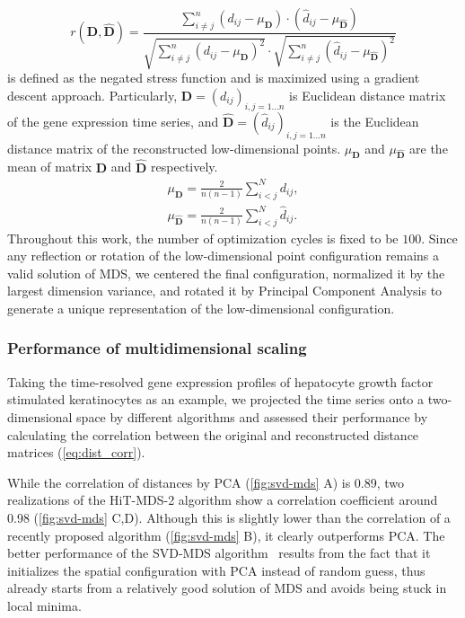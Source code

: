 \begin{equation}
  r(\boldsymbol{D}, \hat{\boldsymbol{D}}) = \frac{\sum_{i \neq j}^n (d_{ij} - \mu_{\boldsymbol{D}}
    ) \cdot (\hat{d}_{ij} - 
    \mu_{\hat{\boldsymbol{D}}})}{\sqrt{\sum_{i \neq j}^n (d_{ij} - \mu_{\boldsymbol{D}})^2} 
    \cdot \sqrt{
    \sum_{i \neq j}^n (\hat{d}_{ij} - \mu_{\hat{\boldsymbol{D}}})^2}}
  \label{eq:dist_corr}
\end{equation}
is defined as the negated stress function and is maximized using a gradient descent approach.
Particularly, $\boldsymbol{D} = (d_{ij})_{i,j=1...n}$ is Euclidean distance matrix of the
gene expression time series, and $\hat{\boldsymbol{D}} = (\hat{d}_{ij})_{i,j=1...n}$ 
is the 
Euclidean distance matrix of the reconstructed low-dimensional points. 
$\mu_{\boldsymbol{D}}$ and $\mu_{\hat{\boldsymbol{D}}}$ are the mean of matrix $\boldsymbol{D}$
and $\hat{\boldsymbol{D}}$ respectively.
\begin{eqnarray}
  \mu_{\boldsymbol{D}} = \frac{2}{n (n-1)} \sum_{i<j}^N d_{ij},\\
  \mu_{\hat{\boldsymbol{D}}} = \frac{2}{n (n-1)} \sum_{i<j}^N \hat{d}_{ij}.
\end{eqnarray}
Throughout this work, the number of optimization cycles is fixed to be $100$.
Since any reflection or rotation of the low-dimensional point configuration
remains a valid solution of MDS,
we centered the final configuration, normalized it by the largest dimension variance,
and rotated it by Principal Component Analysis to generate a unique 
representation of the low-dimensional configuration.

\subsubsection{Performance of multidimensional scaling}
Taking the time-resolved gene expression profiles of hepatocyte growth factor
stimulated keratinocytes as an example, we projected the time series onto a 
two-dimensional space by different algorithms and assessed their performance
by calculating the correlation between the original and reconstructed distance
matrices (\ref{eq:dist_corr}).

While the correlation of distances by PCA (\ref{fig:svd-mds} A) is 0.89, two 
realizations of the HiT-MDS-2 algorithm show a correlation coefficient around 
0.98 (\ref{fig:svd-mds} C,D). Although this is slightly lower than the correlation of a recently 
proposed algorithm (\ref{fig:svd-mds} B), it clearly outperforms PCA. The 
better performance of the SVD-MDS algorithm~\citep{Becavin2011} results from
the fact that it initializes the spatial configuration with PCA instead of 
random guess, thus already starts from a relatively good solution of MDS and
avoids being stuck in local minima.

